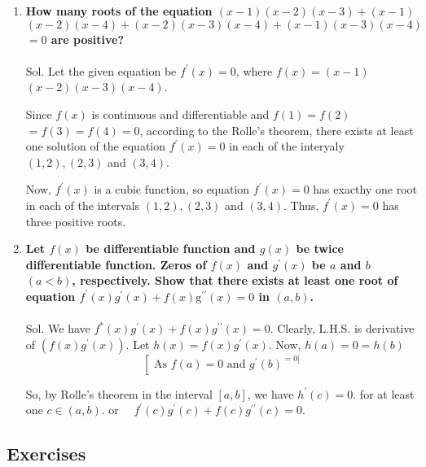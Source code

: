\begin{enumerate}
    \item \textbf{How many roots of the equation $(x-1)(x-2)(x-3)+(x-1)$ $(x-2)(x-4)+(x-2)(x-3)(x-4)+(x-1)(x-3)(x-4)$ $=0$ are positive?}\\\\
Sol. Let the given equation be $f^{\prime}(x)=0$, where $f(x)=(x-1)$ $(x-2)(x-3)(x-4)$.

Since $f(x)$ is continuous and differentiable and $f(1)=f(2)$ $=f(3)=f(4)=0$, according to the Rolle's theorem, there exists at least one solution of the equation $f^{\prime}(x)=0$ in each of the interyaly $(1,2),(2,3)$ and $(3,4)$.

Now, $f^{\prime}(x)$ is a cubic function, so equation $f^{\prime}(x)=0$ has exacthy one root in each of the intervals $(1,2),(2,3)$ and $(3,4)$.
Thus, $f^{\prime}(x)=0$ has three positive roots.


\item \textbf{Let $f(x)$ be differentiable function and $g(x)$ be twice differentiable function. Zeros of $f(x)$ and $g^{\prime}(x)$ be $a$ and $b$ $(a<b)$, respectively. Show that there exists at least one root of equation $f^{\prime}(x) g^{\prime}(x)+f(x) \mathrm{g}^{\prime \prime}(x)=0$ in $(a, b)$.}\\\\

Sol. We have $f^*(x) g^{\prime}(x)+f(x) g^{\prime \prime}(x)=0$.
Clearly, L.H.S. is derivative of $\left(f(x) g^{\prime}(x)\right)$.
Let $h(x)=f(x) g^{\prime}(x)$.
Now, $h(a)=0=h(b)$
$$
\left[\text { As } f(a)=0 \text { and } g^{\prime}(b)^{=0]} \right.
$$

So, by Rolle's theorem in the interval $[a, b]$, we have $h^{\prime}(c)=0$. for at least one $c \in(a, b)$.
or $\quad f^{\prime}(c) g^{\prime}(c)+f(c) g^{\prime \prime}(c)=0$.

\end{enumerate}


\subsection{Exercises}


